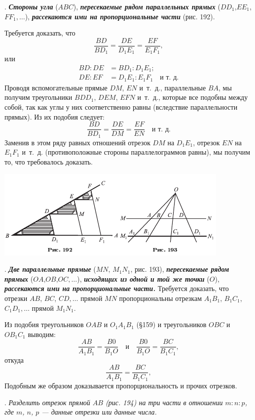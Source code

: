 \documentclass[oneside]{book}
\begin{document}
.
\textbf{\emph{Стороны угла}} ($ABC$), \textbf{\emph{пересекаемые рядом параллельных прямых}} ($DD_1$,$EE_1$,$FF_1,\dots$), \textbf{\emph{рассекаются ими на пропорциональные части}} (рис. 192).

Требуется доказать, что
\[\frac{BD}{BD_1}=\frac{DE}{D_1E_1}=\frac{EF}{E_1F_1},\]
или
\begin{align*}
BD:DE&=BD_1:D_1E_1;
\\
DE:EF&=D_1E_1:E_1F_1\quad\text{и т.~д.}
\end{align*}
Проводя вспомогательные прямые $DM$, $EN$ и~т.~д., параллельные $BA$, мы получим треугольники $BDD_1$, $DEM$, $EFN$ и~т.~д., которые все подобны между собой, так как углы у них соответственно равны (вследствие параллельности прямых).
Из их подобия следует:
\[\frac{BD}{BD_1}=\frac{DE}{DM}=\frac{EF}{EN}\quad\text{и т.~д.}\]
Заменив в этом ряду равных отношений отрезок $DM$ на $D_1E_1$, отрезок $EN$ на $E_1F_1$ и~т.~д.
(противоположные стороны параллелограммов равны), мы получим то, что требовалось доказать.

\includegraphics{pics/ris-192-193}

.
\textbf{\emph{Две параллельные прямые}} ($MN$, $M_1N_1$, рис. 193), \textbf{\emph{пересекаемые рядом прямых}} ($OA$,$OB$,$OC,\dots$), \textbf{\emph{исходящих из одной и той же точки}} ($O$), \textbf{\emph{рассекаются ими на пропорциональные части.}}
Требуется доказать, что отрезки $AB$, $BC$, $CD,\dots$
прямой $MN$ пропорциональны отрезкам $A_1B_1$, $B_1C_1$, $C_1D_1,\dots$
прямой $M_1N_1$.

Из подобия треугольников $OAB$ и $O_1A_1B_1$ (§159) и треугольников $OBC$ и $OB_1C_1$ выводим:
\[\frac{AB}{A_1B_1}=\frac{B0}{B_1O}
\quad\text{и}\quad
\frac{B0}{B_1O}=\frac{BC}{B_1C_1},
\]
откуда
\[\frac{AB}{A_1B_1}=\frac{BC}{B_1C_1},
\]
Подобным же образом доказывается пропорциональность и прочих отрезков.

.
\emph{Разделить отрезок прямой $AB$ \emph{(рис. 194)} на три части в отношении $m:n:p$, где $m$, $n$, $p$ — данные отрезки или данные числа.}
\end{document}
